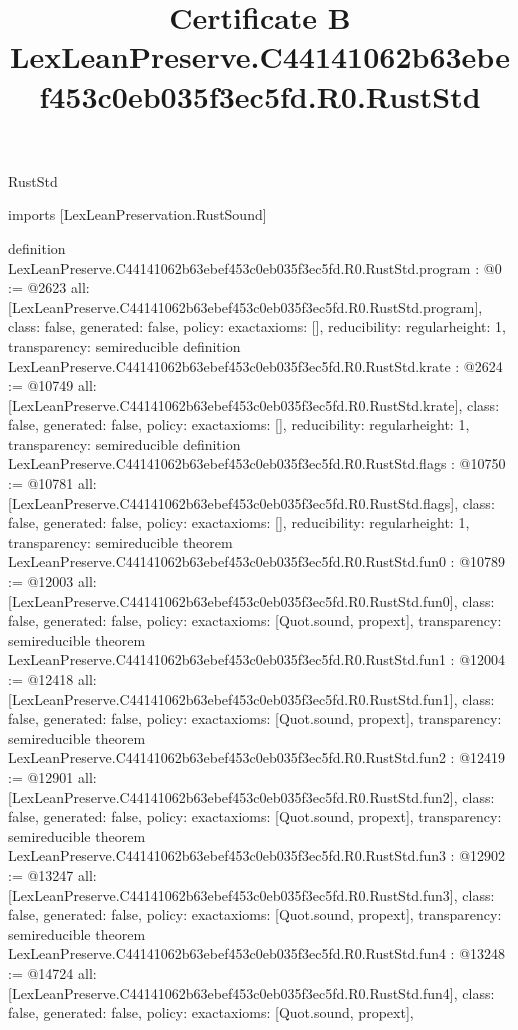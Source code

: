 \begin{lexlean}{RustStd}
\title{Certificate B LexLeanPreserve.C44141062b63ebef453c0eb035f3ec5fd.R0.RustStd}
\begin{coremodule}
imports [LexLeanPreservation.RustSound]

definition LexLeanPreserve.C44141062b63ebef453c0eb035f3ec5fd.R0.RustStd.program : @0 := @2623 {
  all: [LexLeanPreserve.C44141062b63ebef453c0eb035f3ec5fd.R0.RustStd.program],
  class: false,
  generated: false,
  policy: exact{axioms: []},
  reducibility: regular{height: 1},
  transparency: semireducible
}
definition LexLeanPreserve.C44141062b63ebef453c0eb035f3ec5fd.R0.RustStd.krate : @2624 := @10749 {
  all: [LexLeanPreserve.C44141062b63ebef453c0eb035f3ec5fd.R0.RustStd.krate],
  class: false,
  generated: false,
  policy: exact{axioms: []},
  reducibility: regular{height: 1},
  transparency: semireducible
}
definition LexLeanPreserve.C44141062b63ebef453c0eb035f3ec5fd.R0.RustStd.flags : @10750 := @10781 {
  all: [LexLeanPreserve.C44141062b63ebef453c0eb035f3ec5fd.R0.RustStd.flags],
  class: false,
  generated: false,
  policy: exact{axioms: []},
  reducibility: regular{height: 1},
  transparency: semireducible
}
theorem LexLeanPreserve.C44141062b63ebef453c0eb035f3ec5fd.R0.RustStd.fun0 : @10789 := @12003 {
  all: [LexLeanPreserve.C44141062b63ebef453c0eb035f3ec5fd.R0.RustStd.fun0],
  class: false,
  generated: false,
  policy: exact{axioms: [Quot.sound, propext]},
  transparency: semireducible
}
theorem LexLeanPreserve.C44141062b63ebef453c0eb035f3ec5fd.R0.RustStd.fun1 : @12004 := @12418 {
  all: [LexLeanPreserve.C44141062b63ebef453c0eb035f3ec5fd.R0.RustStd.fun1],
  class: false,
  generated: false,
  policy: exact{axioms: [Quot.sound, propext]},
  transparency: semireducible
}
theorem LexLeanPreserve.C44141062b63ebef453c0eb035f3ec5fd.R0.RustStd.fun2 : @12419 := @12901 {
  all: [LexLeanPreserve.C44141062b63ebef453c0eb035f3ec5fd.R0.RustStd.fun2],
  class: false,
  generated: false,
  policy: exact{axioms: [Quot.sound, propext]},
  transparency: semireducible
}
theorem LexLeanPreserve.C44141062b63ebef453c0eb035f3ec5fd.R0.RustStd.fun3 : @12902 := @13247 {
  all: [LexLeanPreserve.C44141062b63ebef453c0eb035f3ec5fd.R0.RustStd.fun3],
  class: false,
  generated: false,
  policy: exact{axioms: [Quot.sound, propext]},
  transparency: semireducible
}
theorem LexLeanPreserve.C44141062b63ebef453c0eb035f3ec5fd.R0.RustStd.fun4 : @13248 := @14724 {
  all: [LexLeanPreserve.C44141062b63ebef453c0eb035f3ec5fd.R0.RustStd.fun4],
  class: false,
  generated: false,
  policy: exact{axioms: [Quot.sound, propext]},
}
\end{coremodule}
\end{lexlean}

